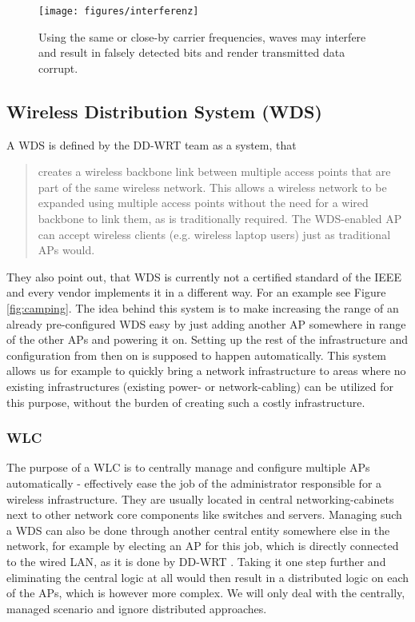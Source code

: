	\begin{figure}[h!]
	  \centering
	  \texttt{[image: figures/interferenz]}
	  \caption{Using the same or close-by carrier frequencies, waves may interfere and result in falsely detected bits and render transmitted data corrupt.}
	  \label{fig:interferenz}
	\end{figure}
	
\newpage
	      
    \subsection{Wireless Distribution System (WDS)}
      A \ac{WDS} is defined by the DD-WRT team \cite{dd_wrt} as a system, that
      
      \begin{quote}
	creates a wireless backbone link between multiple access points that are part of the same wireless network. 
	This allows a wireless network to be expanded using multiple access points without the need for a wired backbone to link them, as is traditionally required. 
	The WDS-enabled \ac{AP} can accept wireless clients (e.g. wireless laptop users) just as traditional APs would.
      \end{quote}

      They also point out, that WDS is currently not a certified standard of the \ac{IEEE} and every vendor implements it in a different way.
      For an example see Figure \ref{fig:camping}. The idea behind this system is to make increasing the range of an already pre-configured \ac{WDS}
      easy by just adding another \ac{AP} somewhere in range of the other APs and powering it on.
      Setting up the rest of the infrastructure and configuration from then on is supposed to happen automatically. 
      This system allows us for example to quickly bring a network infrastructure to areas where no 
      existing infrastructures (existing power- or network-cabling) can be utilized for this purpose, without the burden of creating such a costly infrastructure.
      
      \subsubsection{\ac{WLC}}
	The purpose of a \ac{WLC} is to centrally manage and configure multiple APs automatically - effectively ease the job of the administrator responsible for a 
	wireless infrastructure. They are usually located in central networking-cabinets next to other network core components like switches and servers.
	Managing such a \ac{WDS} can also be done through another central entity somewhere else in the network, for example by
	electing an \ac{AP} for this job, which is directly connected to the wired \ac{LAN}, as it is done by DD-WRT \cite{dd_wrt}. 
	Taking it one step further and eliminating the central logic at all would then result in a distributed logic on each of the APs, which is however more complex. 
	We will only deal with the centrally, managed scenario and ignore distributed approaches.
	
